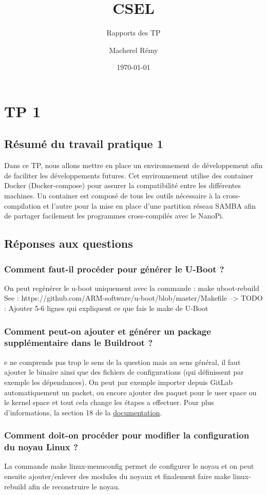\documentclass{ReportTemplate}
\title{CSEL}
\author{Macherel Rémy}
\date{\today}
\subtitle{Rapports des TP}
\begin{document}
\maketitlepage

\newpage

\maketableofcontent

\medskip
\chapter{TP 1}
\section{Résumé du travail pratique 1}
Dans ce TP, nous allons mettre en place un environnement de développement afin
de faciliter les développements futures. Cet environnement utilise des container
Docker (Docker-compose) pour assurer la compatibilité entre les différentes
machines. Un container est composé de tous les outils nécessaire à la
cross-compilation et l'autre pour la mise en place d'une partition réseau SAMBA
afin de partager facilement les programmes cross-compilés avec le NanoPi.
\section{Réponses aux questions}
\subsection{Comment faut-il procéder pour générer le U-Boot ?}
On peut regénérer le u-boot uniquement avec la commande : make
uboot-rebuild\newline
See : https://github.com/ARM-software/u-boot/blob/master/Makefile \newline
--> TODO : Ajouter 5-6 lignes qui expliquent ce que fais le make de U-Boot
\subsection{Comment peut-on ajouter et générer un package supplémentaire dans le Buildroot ?}
e ne comprends pas trop le sens de la question mais au sens général, il faut
ajouter le binaire ainsi que des fichiers de configurations (qui définissent par
exemple les dépendances). On peut par exemple importer depuis GitLab
automatiquement un packet, ou encore ajouter des paquet pour le user space ou le
kernel space et tout cela change les étapes a effectuer. Pour plus
d'informations, la section 18 de la
\href{https://buildroot.org/downloads/manual/manual.html#adding-packages}{documentation}.

\subsection{Comment doit-on procéder pour modifier la configuration du noyau Linux ?}
La commande make linux-menuconfig permet de configurer le noyau et on peut
ensuite ajouter/enlever des modules du noyaux et finalement faire make
linux-rebuild afin de reconstruire le noyau.
\newpage
\end{document}
